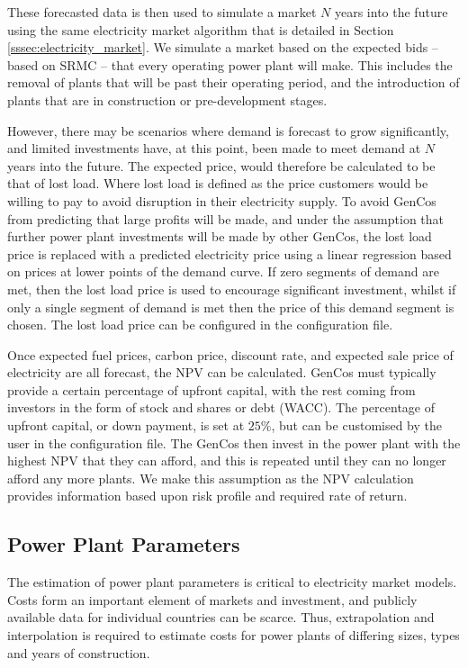 These forecasted data is then used to simulate a market $N$ years into the future using the same electricity market algorithm that is detailed in Section \ref{sssec:electricity_market}. We simulate a market based on the expected bids -- based on SRMC -- that every operating power plant will make. This includes the removal of plants that will be past their operating period, and the introduction of plants that are in construction or pre-development stages. 

However, there may be scenarios where demand is forecast to grow significantly, and limited investments have, at this point, been made to meet demand at $N$ years into the future. The expected price, would therefore be calculated to be that of lost load. Where lost load is defined as the price customers would be willing to pay to avoid disruption in their electricity supply. To avoid GenCos from predicting that large profits will be made, and under the assumption that further power plant investments will be made by other GenCos, the lost load price is replaced with a predicted electricity price using a linear regression based on prices at lower points of the demand curve. If zero segments of demand are met, then the lost load price is used to encourage significant investment, whilst if only a single segment of demand is met then the price of this demand segment is chosen. The lost load price can be configured in the configuration file.

Once expected fuel prices, carbon price, discount rate, and expected sale price of electricity are all forecast, the NPV can be calculated. GenCos must typically provide a certain percentage of upfront capital, with the rest coming from investors in the form of stock and shares or debt (WACC). The percentage of upfront capital, or down payment, is set at $25\%$, but can be customised by the user in the configuration file. The GenCos then invest in the power plant with the highest NPV that they can afford, and this is repeated until they can no longer afford any more plants. We make this assumption as the NPV calculation provides information based upon risk profile and required rate of return.

\subsection{Power Plant Parameters}\label{ssssec:powerplantparameters}



The estimation of power plant parameters is critical to electricity market models. Costs form an important element of markets and investment, and publicly available data for individual countries can be scarce. Thus, extrapolation and interpolation is required to estimate costs for power plants of differing sizes, types and years of construction.

